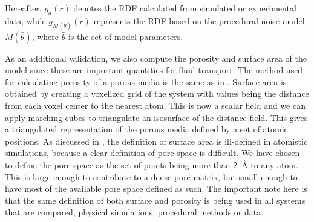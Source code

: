 \documentclass[aps,pre,twocolumn,letterpaper,floatfix,showpacs]{revtex4}
\begin{document}
Hereafter, $g_d(r)$ denotes the RDF calculated from simulated or experimental data,
while $g_{M(\bar \theta)}(r)$ represents the RDF based on the procedural noise
model $M(\bar \theta)$, where $\bar \theta$ is the set of model parameters. 

As an additional validation, we also compute the porosity and surface area of the model since these are important quantities for fluid transport.
The method used for calculating porosity of a porous media is the same as in \cite{gelb1998characterization}.
Surface area is obtained by creating a voxelized grid of the system with values being the distance from each voxel center to the nearest atom.
This is now a scalar field and we can apply marching cubes\cite{lorensen1987marching} to triangulate an isosurface of the distance field.
This gives a triangulated representation of the porous media defined by a set of atomic positions.
As discussed in \cite{gelb1998characterization}, the definition of surface area is ill-defined in
atomistic simulations, because a clear definition of pore space is difficult.
We have chosen to define the pore space as the set of points being more than \SI{2}{\angstrom} to any atom.
This is large enough to contribute to a dense pore matrix, but small enough to have most of the available pore space defined as such. 
The important note here is that the same definition of both surface and porosity is being used in all systems that are compared, physical simulations, procedural methods or data. 





\end{document}
